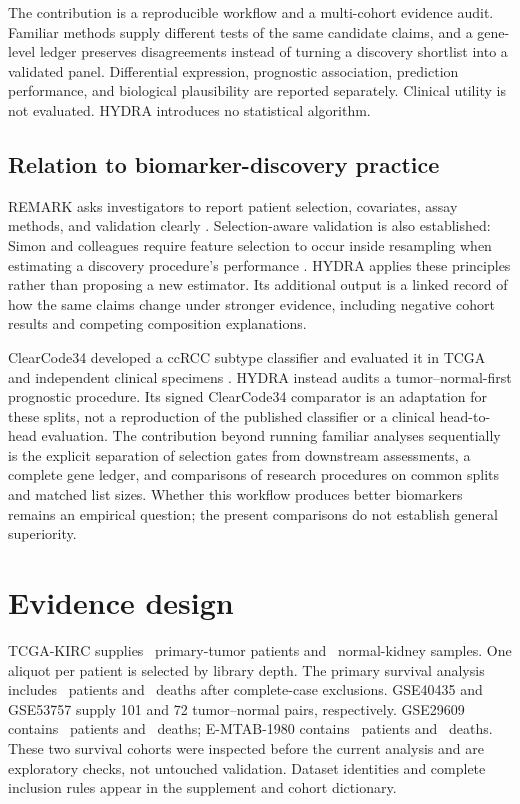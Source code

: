 \documentclass{article}
\begin{document}
The contribution is a reproducible workflow and a multi-cohort evidence audit. Familiar methods supply different tests of the same candidate claims, and a gene-level ledger preserves disagreements instead of turning a discovery shortlist into a validated panel. Differential expression, prognostic association, prediction performance, and biological plausibility are reported separately. Clinical utility is not evaluated. HYDRA introduces no statistical algorithm.

\subsection{Relation to biomarker-discovery practice}
REMARK asks investigators to report patient selection, covariates, assay methods, and validation clearly \cite{mcshane_remark_2005}. Selection-aware validation is also established: Simon and colleagues require feature selection to occur inside resampling when estimating a discovery procedure's performance \cite{simon_pitfalls_2003}. HYDRA applies these principles rather than proposing a new estimator. Its additional output is a linked record of how the same claims change under stronger evidence, including negative cohort results and competing composition explanations.

ClearCode34 developed a ccRCC subtype classifier and evaluated it in TCGA and independent clinical specimens \cite{brooks_clearcode34_2014}. HYDRA instead audits a tumor--normal-first prognostic procedure. Its signed ClearCode34 comparator is an adaptation for these splits, not a reproduction of the published classifier or a clinical head-to-head evaluation. The contribution beyond running familiar analyses sequentially is the explicit separation of selection gates from downstream assessments, a complete gene ledger, and comparisons of research procedures on common splits and matched list sizes. Whether this workflow produces better biomarkers remains an empirical question; the present comparisons do not establish general superiority.

\section{Evidence design}
TCGA-KIRC supplies \TumorPatients\ primary-tumor patients and \NormalPatients\ normal-kidney samples. One aliquot per patient is selected by library depth. The primary survival analysis includes \NestedPatients\ patients and \NestedEvents\ deaths after complete-case exclusions. GSE40435 and GSE53757 supply 101 and 72 tumor--normal pairs, respectively. GSE29609 contains \GsePatients\ patients and \GseEvents\ deaths; E-MTAB-1980 contains \EmPatients\ patients and \EmEvents\ deaths. These two survival cohorts were inspected before the current analysis and are exploratory checks, not untouched validation. Dataset identities and complete inclusion rules appear in the supplement and cohort dictionary.
\end{document}
